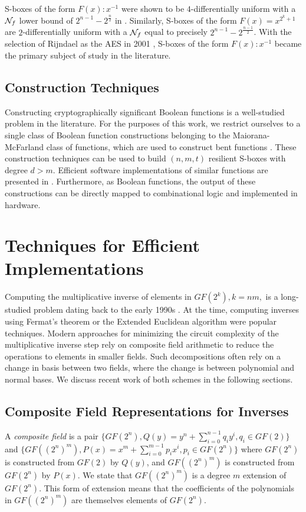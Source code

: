 S-boxes of the form $F(x) : x^{-1}$ were shown to be $4$-differentially uniform 
with a $\mathcal{N}_{f}$ lower bound of $2^{n-1} - 2^{\frac{n}{2}}$ in \cite{Nyberg94-1}.
Similarly, S-boxes of the form $F(x) = x^{2^{k} + 1}$ are $2$-differentially uniform
with a $\mathcal{N}_{f}$ equal to precisely $2^{n-1} - 2^{\frac{n-1}{2}}$. With the selection
of Rijndael as the AES in 2001 \cite{Daemen02-1}, S-boxes of the form $F(x) : x^{-1}$
became the primary subject of study in the literature. 


\subsection{Construction Techniques}
Constructing cryptographically significant Boolean functions is a well-studied problem
in the literature. For the purposes of this work, we restrict ourselves to a 
single class of Boolean function constructions belonging to the Maiorana-McFarland
class of functions, which are used to construct bent functions \cite{Gupta05-1, Gupta02-1}. 
These construction techniques can be used to build $(n,m,t)$ resilient S-boxes with
degree $d > m$. Efficient software implementations of similar functions are
presented in \cite{Gupta02-1}. Furthermore, as Boolean functions, the output of these
constructions can be directly mapped to combinational logic and implemented in hardware. 


\section{Techniques for Efficient Implementations}
Computing the multiplicative inverse of elements in $GF(2^k), k = nm,$ is a long-studied
problem dating back to the early 1990s \cite{Brunner93-1}. At the time, computing
inverses using Fermat's theorem or the Extended Euclidean algorithm were popular 
techniques. Modern approaches for minimizing the circuit complexity of the multiplicative inverse step
rely on composite field arithmetic to reduce the operations
to elements in smaller fields. Such decompositions often rely on a change in basis between
two fields, where the change is between polynomial and normal bases.
We discuss recent work of both schemes in the following sections.

\subsection{Composite Field Representations for Inverses}
A \emph{composite field} is a pair $\{GF(2^n), Q(y) = y^n + \sum_{i=0}^{n-1}q_iy^i, q_i \in GF(2)\}$ and
$\{GF((2^n)^m), P(x) = x^m + \sum_{i=0}^{m-1}p_ix^i, p_i \in GF(2^n)\}$ where $GF(2^n)$ 
is constructed from $GF(2)$ by $Q(y)$, and $GF((2^n)^m)$ is constructed from 
$GF(2^n)$ by $P(x)$. We state that $GF((2^n)^m)$ is a degree $m$ extension of $GF(2^n)$.
This form of extension means that the coefficients of the polynomials in $GF((2^n)^m)$
are themselves elements of $GF(2^n)$. 

